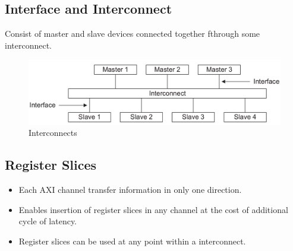 \documentclass{article}
\begin{document}
\subsection{Interface and Interconnect}
\quad Consist of master and slave devices connected together fthrough some interconnect.
\begin{figure}[H]
    \centering
    \includegraphics[width=1\textwidth]{./Resources/interconnect.png}
    \caption{Interconnects}
\end{figure}

\subsection{Register Slices}
\begin{itemize}
    \item Each AXI channel transfer information in only one direction.
    \item Enables insertion of register slices in any channel at the cost of additional cycle of latency.
    \item Register slices can be used at any point within a interconnect.
\end{itemize}
\end{document}
